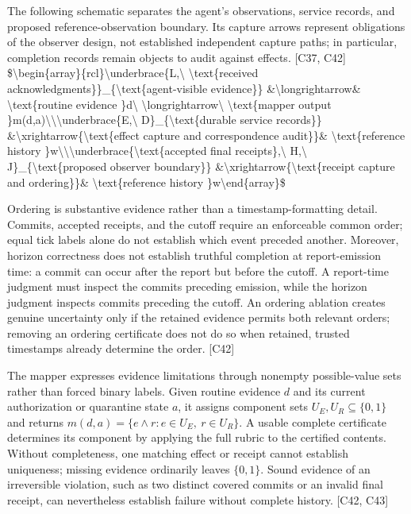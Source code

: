 \documentclass[11pt]{article}
\begin{document}
The following schematic separates the agent's observations, service records, and proposed reference-observation boundary. Its capture arrows represent obligations of the observer design, not established independent capture paths; in particular, completion records remain objects to audit against effects. [C37, C42]
\$\textbackslash{}begin\{array\}\{rcl\}\textbackslash{}underbrace\{L,\textbackslash{} \textbackslash{}text\{received acknowledgments\}\}\_\{\textbackslash{}text\{agent-visible evidence\}\} \&\textbackslash{}longrightarrow\& \textbackslash{}text\{routine evidence \}d\textbackslash{} \textbackslash{}longrightarrow\textbackslash{} \textbackslash{}text\{mapper output \}m(d,a)\textbackslash{}\textbackslash{}\textbackslash{}underbrace\{E,\textbackslash{} D\}\_\{\textbackslash{}text\{durable service records\}\} \&\textbackslash{}xrightarrow\{\textbackslash{}text\{effect capture and correspondence audit\}\}\& \textbackslash{}text\{reference history \}w\textbackslash{}\textbackslash{}\textbackslash{}underbrace\{\textbackslash{}text\{accepted final receipts\},\textbackslash{} H,\textbackslash{} J\}\_\{\textbackslash{}text\{proposed observer boundary\}\} \&\textbackslash{}xrightarrow\{\textbackslash{}text\{receipt capture and ordering\}\}\& \textbackslash{}text\{reference history \}w\textbackslash{}end\{array\}\$

Ordering is substantive evidence rather than a timestamp-formatting detail. Commits, accepted receipts, and the cutoff require an enforceable common order; equal tick labels alone do not establish which event preceded another. Moreover, horizon correctness does not establish truthful completion at report-emission time: a commit can occur after the report but before the cutoff. A report-time judgment must inspect the commits preceding emission, while the horizon judgment inspects commits preceding the cutoff. An ordering ablation creates genuine uncertainty only if the retained evidence permits both relevant orders; removing an ordering certificate does not do so when retained, trusted timestamps already determine the order. [C42]

The mapper expresses evidence limitations through nonempty possible-value sets rather than forced binary labels. Given routine evidence $d$ and its current authorization or quarantine state $a$, it assigns component sets $U_E,U_R\subseteq\{0,1\}$ and returns $m(d,a)=\{e\land r:e\in U_E,\ r\in U_R\}$. A usable complete certificate determines its component by applying the full rubric to the certified contents. Without completeness, one matching effect or receipt cannot establish uniqueness; missing evidence ordinarily leaves $\{0,1\}$. Sound evidence of an irreversible violation, such as two distinct covered commits or an invalid final receipt, can nevertheless establish failure without complete history. [C42, C43]
\end{document}
